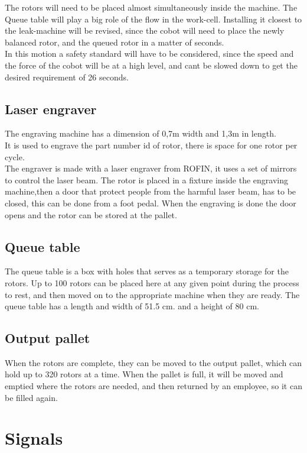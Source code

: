  The rotors will need to be placed almost simultaneously inside the machine. The Queue table will play a big role of the flow in the work-cell. Installing it closest to the leak-machine will be revised, since the cobot will need to place the newly balanced rotor, and the queued rotor in a matter of seconds.\\ 
 In this motion a safety standard will have to be considered, since the speed and the force of the cobot will be at a high level, and cant be slowed down to get the desired requirement of 26 seconds.\\
 
 \subsection{Laser engraver}
 The engraving machine has a dimension of 0,7m width and 1,3m in length.\\
 It is used to engrave the part number id of rotor, there is space for one rotor per cycle.\\
 The engraver is made with a laser engraver from ROFIN, it uses a set of mirrors to control the laser beam\cite{laser}. The rotor is placed in a fixture inside the engraving machine,then a door that protect people from the harmful laser beam, has to be closed, this can be done from a foot pedal. When the engraving is done the door opens and the rotor can be stored at the pallet.   
 
 \subsection{Queue table}
 The queue table is a box with holes that serves as a temporary storage for the rotors. Up to 100 rotors can be placed here at any given point during the process to rest, and then moved on to the appropriate machine when they are ready. The queue table has a length and width of 51.5 cm. and a height of 80 cm.  
 
 \subsection{Output pallet}
 When the rotors are complete, they can be moved to the output pallet, which can hold up to 320 rotors at a time. When the pallet is full, it will be moved and emptied where the rotors are needed, and then returned by an employee, so it can be filled again. 
 
 \section{Signals}
 
